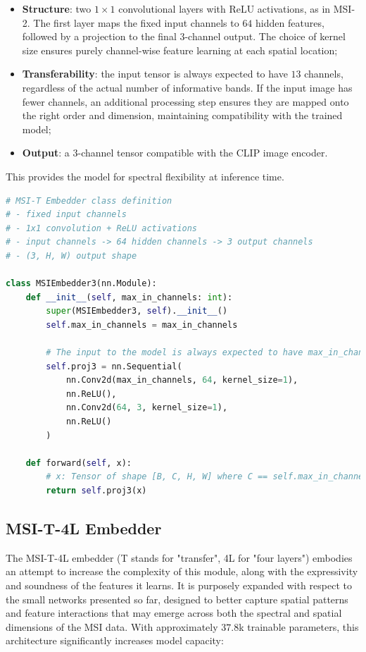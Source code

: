 \documentclass[a4paper, oneside, english]{sapthesis} %
\begin{document}
\begin{itemize}
    \item \textbf{Structure}: two $1\times1$ convolutional layers with ReLU activations, as in MSI-2. The first layer maps the fixed input channels to $64$ hidden features, followed by a projection to the final 3-channel output. The choice of kernel size ensures purely channel-wise feature learning at each spatial location;
    \item \textbf{Transferability}: the input tensor is always expected to have $13$ channels, regardless of the actual number of informative bands. If the input image has fewer channels, an additional processing step ensures they are mapped onto the right order and dimension, maintaining compatibility with the trained model;
    \item \textbf{Output}: a $3$-channel tensor compatible with the CLIP image encoder.
\end{itemize}

This provides the model for spectral flexibility at inference time.

\begin{lstlisting}[language=Python, caption={MSI-T Embedder implemented in PyTorch.},  label={lst:msi_t}]
# MSI-T Embedder class definition
# - fixed input channels
# - 1x1 convolution + ReLU activations
# - input channels -> 64 hidden channels -> 3 output channels
# - (3, H, W) output shape

class MSIEmbedder3(nn.Module):
    def __init__(self, max_in_channels: int):
        super(MSIEmbedder3, self).__init__()
        self.max_in_channels = max_in_channels

        # The input to the model is always expected to have max_in_channels -> the forward is different
        self.proj3 = nn.Sequential(
            nn.Conv2d(max_in_channels, 64, kernel_size=1),
            nn.ReLU(),
            nn.Conv2d(64, 3, kernel_size=1),
            nn.ReLU()
        )

    def forward(self, x):
        # x: Tensor of shape [B, C, H, W] where C == self.max_in_channels
        return self.proj3(x)
\end{lstlisting}


\subsection{MSI-T-4L Embedder}

The MSI-T-4L embedder (T stands for "transfer", 4L for "four layers") embodies an attempt to increase the complexity of this module, along with the expressivity and soundness of the features it learns. It is purposely expanded with respect to the small networks presented so far, designed to better capture spatial patterns and feature interactions that may emerge across both the spectral and spatial dimensions of the MSI data. With approximately $37.8$k trainable parameters, this architecture significantly increases model capacity:
\end{document}
